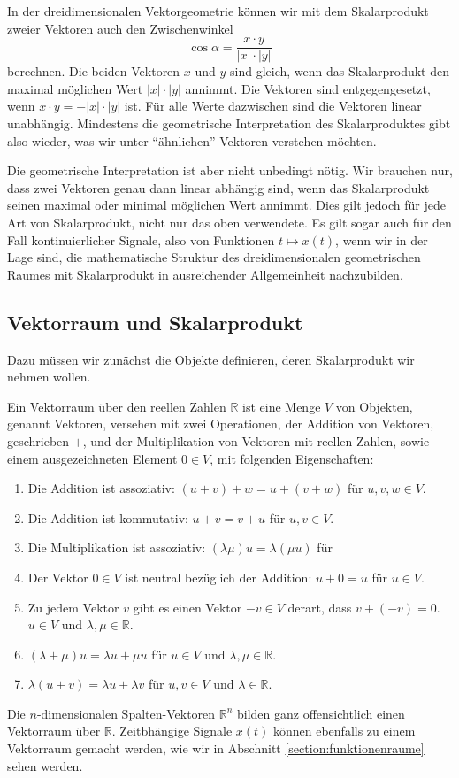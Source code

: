 In der dreidimensionalen Vektorgeometrie können wir mit dem Skalarprodukt
zweier Vektoren auch den Zwischenwinkel
\[
\cos\alpha
=
\frac{
x\cdot y
}{
|x|\cdot |y|
}
\]
berechnen.
Die beiden Vektoren $x$ und $y$ sind gleich, wenn das Skalarprodukt
den maximal möglichen Wert $|x|\cdot |y|$ annimmt.
Die Vektoren sind entgegengesetzt, wenn $x\cdot y=-|x|\cdot |y|$ ist.
Für alle Werte dazwischen sind die Vektoren linear unabhängig.
Mindestens die geometrische Interpretation des Skalarproduktes gibt also
wieder, was wir unter ``ähnlichen'' Vektoren verstehen möchten.

Die geometrische Interpretation ist aber nicht unbedingt nötig.
Wir brauchen nur, dass zwei Vektoren genau dann linear abhängig sind,
wenn das Skalarprodukt seinen maximal oder minimal möglichen Wert annimmt.
Dies gilt jedoch für jede Art von Skalarprodukt, nicht nur das oben
verwendete.
Es gilt sogar auch für den Fall kontinuierlicher Signale, also von
Funktionen $t\mapsto x(t)$, wenn wir in der Lage sind, die mathematische
Struktur des dreidimensionalen geometrischen Raumes mit Skalarprodukt
in ausreichender Allgemeinheit nachzubilden.

\subsection{Vektorraum und Skalarprodukt}
Dazu müssen wir zunächst die Objekte definieren, deren Skalarprodukt wir
nehmen wollen.
\begin{definition}
Ein Vektorraum über den reellen Zahlen $\mathbb R$ ist eine Menge $V$ 
von Objekten, genannt Vektoren, versehen mit zwei Operationen, der
Addition von Vektoren, geschrieben $+$, und der Multiplikation von Vektoren
mit reellen Zahlen, sowie einem ausgezeichneten Element $0\in V$, mit
folgenden Eigenschaften:
\begin{enumerate}
\item Die Addition ist assoziativ: $(u+v)+w = u+(v+w)$ für $u,v,w\in V$.
\item Die Addition ist kommutativ: $u+v=v+u$ für $u,v\in V$.
\item Die Multiplikation ist assoziativ: $(\lambda \mu)u=\lambda (\mu u)$ für
\item Der Vektor $0\in V$ ist neutral bezüglich der Addition: $u+0=u$ für
$u\in V$.
\item Zu jedem Vektor $v$ gibt es einen Vektor $-v\in V$ derart, dass
$v+(-v)=0$.
$u\in V$ und $\lambda,\mu\in\mathbb R$.
\item $(\lambda + \mu) u = \lambda u + \mu u$ für $u\in V$ und
$\lambda,\mu\in \mathbb R$.
\item $\lambda (u + v) = \lambda u + \lambda v$ für $u,v\in V$ und
$\lambda\in\mathbb R$.
\end{enumerate}
\end{definition}
Die $n$-dimensionalen Spalten-Vektoren $\mathbb R^n$ bilden ganz offensichtlich
einen Vektorraum über $\mathbb R$.
Zeitbhängige Signale $x(t)$ können ebenfalls zu einem Vektorraum gemacht
werden, wie wir in Abschnitt \ref{section:funktionenraume} sehen werden.

